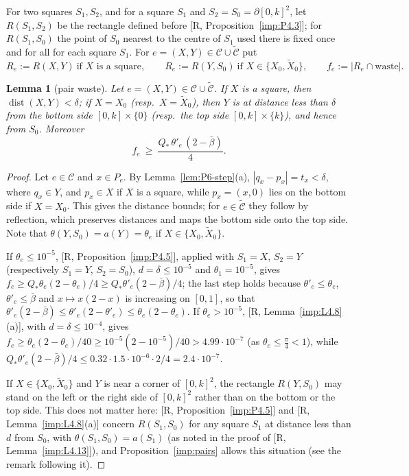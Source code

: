 \documentclass[11pt]{amsart}
\newcommand{\dist}{\operatorname{dist}}
\newcommand{\bbar}{\bar\beta}
\newtheorem{lemma}[theorem]{Lemma}
\theoremstyle{definition}
\theoremstyle{remark}
\numberwithin{equation}{section}
\begin{document}
For two squares $S_1,S_2$, and for a square $S_1$ and $S_2=S_0=\partial[0,k]^2$, let $R(S_1,S_2)$ be the rectangle
defined before [R, Proposition~\ref{imp:P4.3}]; for $R(S_1,S_0)$ the point of $S_0$ nearest to the centre of $S_1$
used there is fixed once and for all for each square $S_1$. For $e=(X,Y)\in\mathcal C\cup\tilde{\mathcal C}$ put
\[
R_e:=R(X,Y)\ \text{if $X$ is a square},\qquad R_e:=R(Y,S_0)\ \text{if $X\in\{X_0,\tilde X_0\}$},\qquad
f_e:=|R_e\cap\text{waste}| .
\]

\begin{lemma}[pair waste]\label{lem:P6-pairwaste}
Let $e=(X,Y)\in\mathcal C\cup\tilde{\mathcal C}$. If $X$ is a square, then $\dist(X,Y)<\delta$; if $X=X_0$
\textup{(}resp.\ $X=\tilde X_0$\textup{)}, then $Y$ is at distance less than $\delta$ from the bottom side
$[0,k]\times\{0\}$ \textup{(}resp.\ the top side $[0,k]\times\{k\}$\textup{)}, and hence from $S_0$. Moreover
\begin{equation}\label{eq:P6-pairwaste}
f_e\ \ge\ \frac{Q_*\,\theta'_e\,(2-\bbar)}{4} .
\end{equation}
\end{lemma}

\begin{proof}
Let $e\in\mathcal C$ and $x\in P_e$. By Lemma~\ref{lem:P6-step}(a), $|q_x-p_x|=t_x<\delta$, where $q_x\in Y$, and
$p_x\in X$ if $X$ is a square, while $p_x=(x,0)$ lies on the bottom side if $X=X_0$. This gives the distance bounds;
for $e\in\tilde{\mathcal C}$ they follow by reflection, which preserves distances and maps the bottom side onto the
top side. Note that $\theta(Y,S_0)=a(Y)=\theta_e$ if $X\in\{X_0,\tilde X_0\}$.

If $\theta_e\le10^{-5}$, [R, Proposition~\ref{imp:P4.5}], applied with $S_1=X$, $S_2=Y$ (respectively $S_1=Y$,
$S_2=S_0$), $d=\delta\le10^{-5}$ and $\theta_1=10^{-5}$, gives $f_e\ge Q_*\theta_e(2-\theta_e)/4\ge Q_*\theta'_e(2-\bbar)/4$;
the last step holds because $\theta'_e\le\theta_e$, $\theta'_e\le\bbar$ and $x\mapsto x(2-x)$ is increasing on
$[0,1]$, so that $\theta'_e(2-\bbar)\le\theta'_e(2-\theta'_e)\le\theta_e(2-\theta_e)$. If $\theta_e>10^{-5}$,
[R, Lemma~\ref{imp:L4.8}(a)], with $d=\delta\le10^{-4}$, gives
$f_e\ge\theta_e(2-\theta_e)/40\ge10^{-5}(2-10^{-5})/40>4.99\cdot10^{-7}$ (as $\theta_e\le\frac\pi4<1$), while
$Q_*\theta'_e(2-\bbar)/4\le0.32\cdot1.5\cdot10^{-6}\cdot2/4=2.4\cdot10^{-7}$.

If $X\in\{X_0,\tilde X_0\}$ and $Y$ is near a corner of $[0,k]^2$, the rectangle $R(Y,S_0)$ may stand on the left
or the right side of $[0,k]^2$ rather than on the bottom or the top side. This does not matter here:
[R, Proposition~\ref{imp:P4.5}] and [R, Lemma~\ref{imp:L4.8}(a)] concern $R(S_1,S_0)$ for any square $S_1$ at distance
less than $d$ from $S_0$, with $\theta(S_1,S_0)=a(S_1)$ (as noted in the proof of [R, Lemma~\ref{imp:L4.13}]), and
Proposition~\ref{imp:pairs} allows this situation (see the remark following it).
\end{proof}
\end{document}
